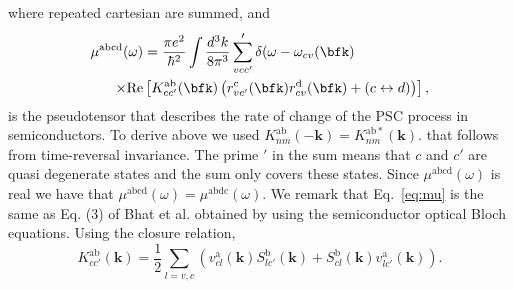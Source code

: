 \documentclass[prb,11pt,tightenlines,twocolumn,aps]{revtex4-1}
\begin{document}
where repeated cartesian are summed, and 
\begin{equation}\label{eq:mu}
\begin{aligned}
\mu^{\mathrm{abcd}}  (\omega) &
=
\frac{\pi e^{2}}{\hbar^{2}} \int 
\frac{d^{3}k}{8 \pi^{3}} \sum'_{vcc'}
  \delta(\omega-\omega_{cv}(\bfk) 
\\
\times\mathrm{Re} & \left[ K^{\mathrm{ab}}_{cc'}(\bfk) 
\left(  
r^{\mathrm{c}}_{vc'}(\bfk)   
r^{\mathrm{d}}_{cv }(\bfk)  +
(c \leftrightarrow d)  
\right) 
\right]
,  
\end{aligned}
\end{equation} 
is the pseudotensor that describes the rate of change of the  PSC process in semiconductors.
To derive above we used  
$
K^{\mathrm{ab}}_{nm}(\mathbf{-k}) = K^{\mathrm{ab*}}_{nm}(\mathbf{k}). 
$
that follows from time-reversal invariance. 
The prime $'$ in the sum means that $c$ and $c'$ are quasi degenerate states and the
sum only covers these states.  Since $\mu^{\mathrm{abcd}}(\omega)$ is real we
have that $\mu^{\mathrm{abcd}}(\omega) =
\mu^{\mathrm{abdc}}(\omega)$. 
We remark that Eq.~\eqref{eq:mu} 
 is the same as Eq. (3) of Bhat et al.\cite{bhatPRL05}
obtained by using the semiconductor optical Bloch equations.
Using the closure relation,
\begin{equation}
K^{\mathrm{ab}}_{cc'}(\mathbf{k}) = \frac{1}{2}
\sum_{l=v,c}
\left(v^{\mathrm{a}}_{cl}(\mathbf{k})S^{\mathrm{b}}_{lc'}(\mathbf{k})
+S^{\mathrm{b}}_{cl}(\mathbf{k}) v^{\mathrm{a}}_{lc'}(\mathbf{k})
\right)
.
\label{eq:velspimatelem}
\end{equation}

\end{document}
